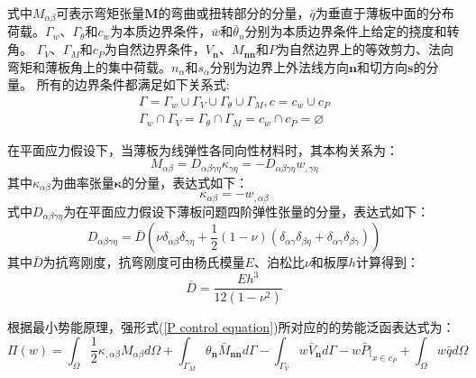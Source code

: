 式中$M_{\alpha\beta}$可表示弯矩张量$\boldsymbol M$的弯曲或扭转部分的分量，$\bar q$为垂直于薄板中面的分布荷载。$\Gamma_w$、$\Gamma_{\theta}$和$c_w$为本质边界条件，$\bar w$和$\bar \theta_n$分别为本质边界条件上给定的挠度和转角。
$\Gamma_V$、$\Gamma_M$和$c_P$为自然边界条件，$V_{\boldsymbol n}$、$M_{\boldsymbol{nn}}$和$P$为自然边界上的等效剪力、法向弯矩和薄板角上的集中荷载。$n_\alpha$和$s_\alpha$分别为边界上外法线方向$\pmb{n}$和切方向$\pmb{s}$的分量。
所有的边界条件都满足如下关系式:
\begin{equation}\label{PGeometric relationships}
    \begin{split}
        \Gamma=\Gamma_w\cup\Gamma_V\cup\Gamma_{\theta}\cup\Gamma_M,c=c_w\cup c_P\\
        \Gamma_w\cap\Gamma_V=\Gamma_{\theta}\cap\Gamma_M=c_w\cap c_P=\varnothing
    \end{split}
\end{equation}\par
在平面应力假设下，当薄板为线弹性各同向性材料时，其本构关系为：
\begin{equation}\label{Malphabeta}
    M_{\alpha\beta}=D_{\alpha\beta\gamma\eta}\kappa_{\gamma\eta}=-D_{\alpha\beta\gamma\eta}w_{,\gamma\eta}
\end{equation}
其中$\kappa_{\alpha\beta}$为曲率张量$\pmb{\kappa}$的分量，表达式如下：
\begin{equation}\label{kappa}
    \kappa_{\alpha\beta}=-w_{,\alpha\beta}
\end{equation}
式中$D_{\alpha \beta \gamma \eta}$为在平面应力假设下薄板问题四阶弹性张量的分量，表达式如下：
\begin{equation}\label{Dalphabeta}
        D_{\alpha\beta\gamma\eta}=\bar D(\nu\delta_{\alpha\beta}\delta_{\gamma\eta}+\frac{1}{2}(1-\nu)(\delta_{\alpha\gamma}\delta_{\beta\eta}+\delta_{\alpha\gamma}\delta_{\beta\gamma}))
\end{equation}
其中$\bar{D}$为抗弯刚度，抗弯刚度可由杨氏模量$E$、泊松比$\nu$和板厚$h$计算得到：
\begin{equation}\label{kangwangangdu}
    \bar D=\frac{Eh^3}{12(1-\nu^2)}
\end{equation}
\par
根据最小势能原理，强形式(\ref{P control equation})所对应的的势能泛函表达式为：
\begin{equation}\label{Pshineng}
    \Pi(w)=\int_{\Omega}\frac{1}{2}\kappa_{,\alpha\beta}M_{\alpha\beta}d\Omega+\int_{\Gamma_M}\theta_{\pmb{n}}\bar{M}_{\pmb{nn}}d\Gamma
    -\int_{\Gamma_V}w\bar{V}_{\pmb{n}}d\Gamma-w\bar{P}\vert_{x\in c_P}+\int_{\Omega}w\bar{q}d\Omega
\end{equation}
